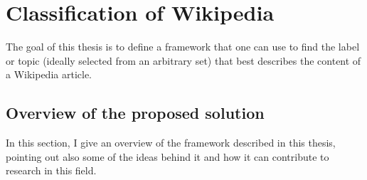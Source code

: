 \chapter{Classification of Wikipedia}
    The goal of this thesis is to define a framework that one can use to find the label or topic (ideally selected from an arbitrary set) that best describes the content of a Wikipedia article.
    \section{Overview of the proposed solution}
        In this section, I give an overview of the framework described in this thesis, pointing out also some of the ideas behind it and how it can contribute to research in this field.
